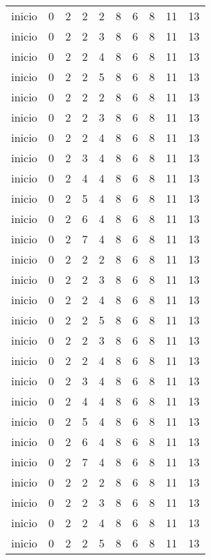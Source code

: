 \documentclass[11pt]{article}
\begin{document}
    \begin{tabular}{r|lllllllll}
	inicio & 0  & 2  & 2  & 2  & 8  & 6  & 8  & 11 & 13\\
	inicio & 0  & 2  & 2  & 3  & 8  & 6  & 8  & 11 & 13\\
	inicio & 0  & 2  & 2  & 4  & 8  & 6  & 8  & 11 & 13\\
	inicio & 0  & 2  & 2  & 5  & 8  & 6  & 8  & 11 & 13\\
	inicio & 0  & 2  & 2  & 2  & 8  & 6  & 8  & 11 & 13\\
	inicio & 0  & 2  & 2  & 3  & 8  & 6  & 8  & 11 & 13\\
	inicio & 0  & 2  & 2  & 4  & 8  & 6  & 8  & 11 & 13\\
	inicio & 0  & 2  & 3  & 4  & 8  & 6  & 8  & 11 & 13\\
	inicio & 0  & 2  & 4  & 4  & 8  & 6  & 8  & 11 & 13\\
	inicio & 0  & 2  & 5  & 4  & 8  & 6  & 8  & 11 & 13\\
	inicio & 0  & 2  & 6  & 4  & 8  & 6  & 8  & 11 & 13\\
	inicio & 0  & 2  & 7  & 4  & 8  & 6  & 8  & 11 & 13\\
	inicio & 0  & 2  & 2  & 2  & 8  & 6  & 8  & 11 & 13\\
	inicio & 0  & 2  & 2  & 3  & 8  & 6  & 8  & 11 & 13\\
	inicio & 0  & 2  & 2  & 4  & 8  & 6  & 8  & 11 & 13\\
	inicio & 0  & 2  & 2  & 5  & 8  & 6  & 8  & 11 & 13\\
	inicio & 0  & 2  & 2  & 3  & 8  & 6  & 8  & 11 & 13\\
	inicio & 0  & 2  & 2  & 4  & 8  & 6  & 8  & 11 & 13\\
	inicio & 0  & 2  & 3  & 4  & 8  & 6  & 8  & 11 & 13\\
	inicio & 0  & 2  & 4  & 4  & 8  & 6  & 8  & 11 & 13\\
	inicio & 0  & 2  & 5  & 4  & 8  & 6  & 8  & 11 & 13\\
	inicio & 0  & 2  & 6  & 4  & 8  & 6  & 8  & 11 & 13\\
	inicio & 0  & 2  & 7  & 4  & 8  & 6  & 8  & 11 & 13\\
	inicio & 0  & 2  & 2  & 2  & 8  & 6  & 8  & 11 & 13\\
	inicio & 0  & 2  & 2  & 3  & 8  & 6  & 8  & 11 & 13\\
	inicio & 0  & 2  & 2  & 4  & 8  & 6  & 8  & 11 & 13\\
	inicio & 0  & 2  & 2  & 5  & 8  & 6  & 8  & 11 & 13\\

\end{tabular}
\end{document}
